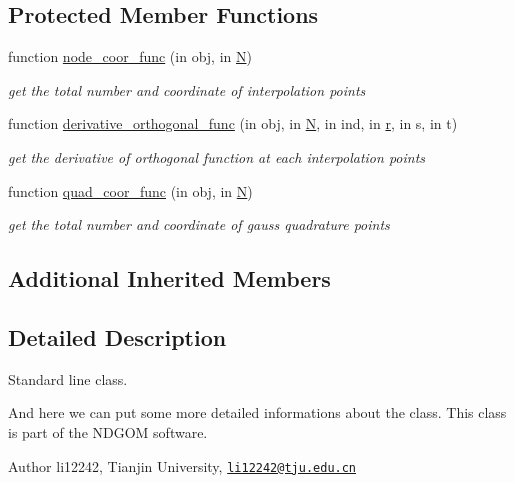 \subsection*{Protected Member Functions}
\begin{DoxyCompactItemize}
\item 
function \hyperlink{class_std_line_aa7b3b3944d10a39cdc319568937df38c}{node\+\_\+coor\+\_\+func} (in obj, in \hyperlink{class_std_cell_a8df35ad5169af36d3dff62644f7878c9}{N})
\begin{DoxyCompactList}\small\item\em get the total number and coordinate of interpolation points \end{DoxyCompactList}\item 
function \hyperlink{class_std_line_a489bba0c881507832b416c98f5f0a064}{derivative\+\_\+orthogonal\+\_\+func} (in obj, in \hyperlink{class_std_cell_a8df35ad5169af36d3dff62644f7878c9}{N}, in ind, in \hyperlink{class_std_cell_a737dd2feb25f74be0215a594334ec622}{r}, in s, in t)
\begin{DoxyCompactList}\small\item\em get the derivative of orthogonal function at each interpolation points \end{DoxyCompactList}\item 
function \hyperlink{class_std_line_ab07707ef0a91858f5fa3b628c51889ec}{quad\+\_\+coor\+\_\+func} (in obj, in \hyperlink{class_std_cell_a8df35ad5169af36d3dff62644f7878c9}{N})
\begin{DoxyCompactList}\small\item\em get the total number and coordinate of gauss quadrature points \end{DoxyCompactList}\end{DoxyCompactItemize}
\subsection*{Additional Inherited Members}


\subsection{Detailed Description}
Standard line class. 

And here we can put some more detailed informations about the class. This class is part of the N\+D\+G\+OM software. \begin{DoxyAuthor}{Author}
li12242, Tianjin University, \href{mailto:li12242@tju.edu.cn}{\tt li12242@tju.\+edu.\+cn} 
\end{DoxyAuthor}


